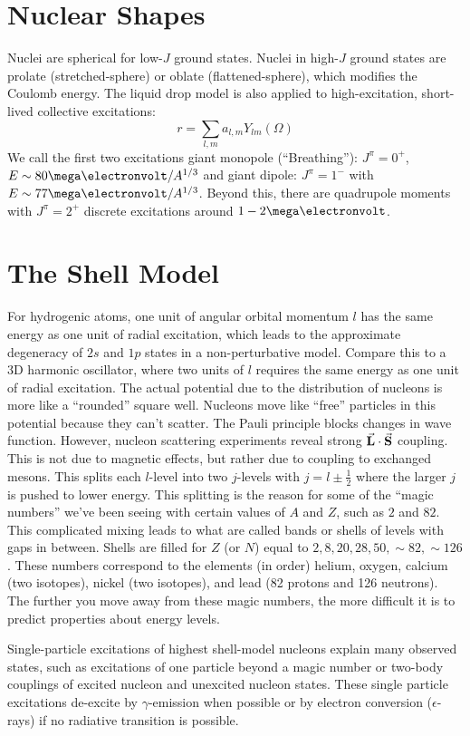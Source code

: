 \documentclass[a4paper,twoside,master.tex]{subfiles}
\begin{document}

\section{Nuclear Shapes}\label{sec:nuclear_shapes}

Nuclei are spherical for low-$ J $ ground states. Nuclei in high-$ J $ ground states are prolate (stretched-sphere) or oblate (flattened-sphere), which modifies the Coulomb energy. The liquid drop model is also applied to high-excitation, short-lived collective excitations:
\begin{equation}
    r = \sum_{l,m} a_{l,m} Y_{lm}(\Omega)
\end{equation}
We call the first two excitations giant monopole (``Breathing''): $ J^{\pi} = 0^+ $, $ E \sim 80\mega\electronvolt / A^{1/3} $ and giant dipole: $ J^{\pi} = 1^- $ with $ E \sim 77\mega\electronvolt / A^{1/3} $. Beyond this, there are quadrupole moments with $ J^{\pi} = 2^+ $ discrete excitations around $ 1 - 2\mega\electronvolt $. 

\section{The Shell Model}\label{sec:the_shell_model}

For hydrogenic atoms, one unit of angular orbital momentum $ l $ has the same energy as one unit of radial excitation, which leads to the approximate degeneracy of $ 2s $ and $ 1p $ states in a non-perturbative model. Compare this to a 3D harmonic oscillator, where two units of $ l $ requires the same energy as one unit of radial excitation. The actual potential due to the distribution of nucleons is more like a ``rounded'' square well. Nucleons move like ``free'' particles in this potential because they can't scatter. The Pauli principle blocks changes in wave function. However, nucleon scattering experiments reveal strong $ \va{L} \cdot \va{S} $ coupling. This is not due to magnetic effects, but rather due to coupling to exchanged mesons. This splits each $ l $-level into two $ j $-levels with $ j = l\pm \frac{1}{2} $ where the larger $ j $ is pushed to lower energy. This splitting is the reason for some of the ``magic numbers'' we've been seeing with certain values of $ A $ and $ Z $, such as $ 2 $ and $ 82 $. This complicated mixing leads to what are called bands or shells of levels with gaps in between. Shells are filled for $ Z $ (or $ N $) equal to $ 2,8,20,28,50, \sim 82, \sim 126 $. These numbers correspond to the elements (in order) helium, oxygen, calcium (two isotopes), nickel (two isotopes), and lead (82 protons and 126 neutrons). The further you move away from these magic numbers, the more difficult it is to predict properties about energy levels.

Single-particle excitations of highest shell-model nucleons explain many observed states, such as excitations of one particle beyond a magic number or two-body couplings of excited nucleon and unexcited nucleon states. These single particle excitations de-excite by $ \gamma $-emission when possible or by electron conversion ($\epsilon$-rays) if no radiative transition is possible.
\end{document}
